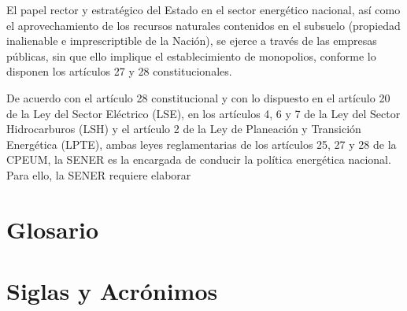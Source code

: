 \documentclass{sener2025}
\begin{document}
El papel rector y estratégico del Estado en el sector energético nacional, así como el aprovechamiento de los recursos naturales contenidos en el subsuelo (propiedad inalienable e imprescriptible de la Nación), se ejerce a través de las empresas públicas, sin que ello implique el establecimiento de monopolios, conforme lo disponen los artículos 27 y 28 constitucionales.

De acuerdo con el artículo 28 constitucional y con lo dispuesto en el artículo 20 de la Ley del Sector Eléctrico (LSE), en los artículos 4, 6 y 7 de la Ley del Sector Hidrocarburos (LSH) y el artículo 2 de la Ley de Planeación y Transición Energética (LPTE), ambas leyes reglamentarias de los artículos 25, 27 y 28 de la CPEUM, la SENER es la encargada de conducir la política energética nacional. Para ello, la SENER requiere elaborar



\section*{Glosario}
{}


\printbibliography

\section*{Siglas y Acrónimos}
{}

\end{document}
